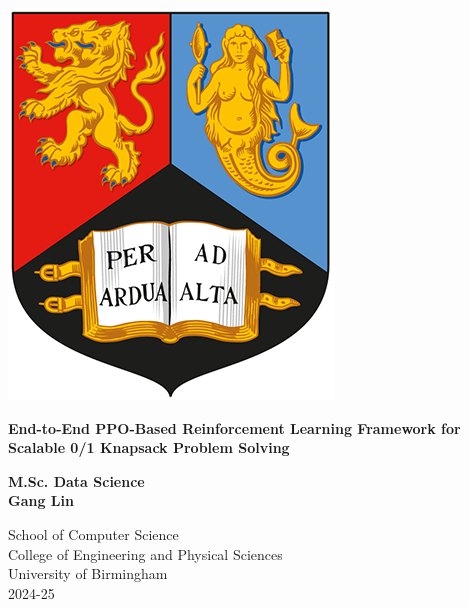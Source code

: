 
\thispagestyle{empty}

\begin{spacing}{2}
	\begin{center}
		\includegraphics[scale = 1.5]{Preamble/BirmCrest.png}
	\end{center}
	\vspace{10mm}
	\begin{center}
		\textbf{\Large End-to-End PPO-Based Reinforcement Learning Framework for Scalable 0/1
Knapsack Problem Solving}
		\vspace{10mm}
	\end{center}
	\begin{center}
		\textbf{\large M.Sc. Data Science}
		\vspace{20mm}
		\\\textbf{\Large Gang Lin}
		\vspace{30mm}
	\end{center}
	\begin{center}
		{\large School of Computer Science}
		\\ {\large College of Engineering and Physical Sciences}
		\\ {\large University of Birmingham}
		\\ {\large 2024-25}
	\end{center}
\end{spacing}



